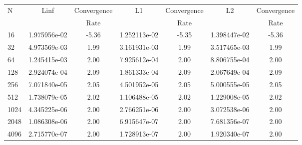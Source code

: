 \documentclass[12pt]{article}
\begin{document}
	\begin{tabular}{l|c|c|c|c|c|c}
		N&Linf&Convergence&L1&Convergence&L2&Convergence\\
		&&Rate&&Rate&&Rate\\
		\hline
		16&1.975956e-02&-5.36&1.252113e-02&-5.35&1.398447e-02&-5.36\\
		\hline
		32&4.973569e-03&1.99&3.161931e-03&1.99&3.517465e-03&1.99\\
		\hline
		64&1.245415e-03&2.00&7.925612e-04&2.00&8.806755e-04&2.00\\
		\hline
		128&2.924074e-04&2.09&1.861333e-04&2.09&2.067649e-04&2.09\\
		\hline
		256&7.071840e-05&2.05&4.501952e-05&2.05&5.000555e-05&2.05\\
		\hline
		512&1.738079e-05&2.02&1.106488e-05&2.02&1.229008e-05&2.02\\
		\hline
		1024&4.345225e-06&2.00&2.766251e-06&2.00&3.072538e-06&2.00\\
		\hline
		2048&1.086308e-06&2.00&6.915647e-07&2.00&7.681356e-07&2.00\\
		\hline
		4096&2.715770e-07&2.00&1.728913e-07&2.00&1.920340e-07&2.00\\
	\end{tabular}
\end{document}
